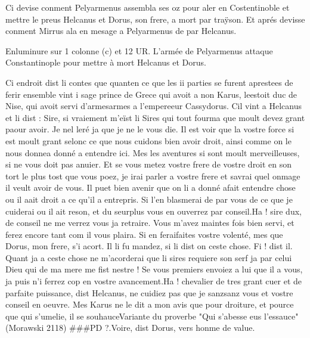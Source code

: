 \documentclass{article}
\begin{document}
\begin{pages}
         
            Ci devise 
               conment Pelyarmenus 
               assembla ses oz pour aler en Costentinoble 
               et mettre le preus Helcanus et 
               Dorus, son frere, 
               a mort par traÿson. Et aprés devisse conment Mirrus 
               ala en mesage a Pelyarmenus de par 
                  Helcanus.
            
               Enluminure sur 1 colonne (c) et 12 UR.
                  L’armée de Pelyarmenus attaque 
                  Constantinople pour mettre à mort 
                  Helcanus et Dorus. 
               
            
\pstart Ci endroit dist li contes que
   quanten ce que les ii parties 
   se furent 
   aprestees de ferir ensemble vint i sage prince de Grece qui avoit a non 
   Karus, leestoit 
      duc de Nise, qui 
   avoit servi d’armesarmes a l’empereeur 
   Cassydorus. Cil vint a Helcanus et li dist :
   Sire, si vraiement m’eïst li Sires qui tout fourma que moult devez grant paour avoir.
      Je nel leré ja 
      que je ne le vous die. Il est voir que la vostre force si est moult grant selonc ce que nous cuidons bien avoir droit, 
      ainsi comme on le nous 
      donnea donné a entendre 
      ici. Mes les aventures si sont moult merveilleuses, si ne vous 
      doit pas anuier. Et se vous metez vostre frere 
   de vostre droit en son tort le plus tost que vous poez, je irai parler a vostre frere 
      et savrai quel onmage il veult avoir de vous. Il puet bien avenir que on li a 
      donné afait entendre chose ou il 
      aait droit a ce qu’il a entrepris. 
   Si l’en blasmerai de par vous de ce que je cuiderai ou il ait reson, et du seurplus vous en ouverrez par conseil.Ha ! sire dux, de conseil ne me verrez vous ja retraire. Vous m’avez maintes fois bien servi, 
      et ferez encore tant com il vous plaira. Si en feraifaites vostre 
      volenté, mes que Dorus, mon frere, s’i acort. 
   Il li fu mandez, si li dist on ceste chose.
   Fi ! dist il. Quant ja a ceste chose ne 
      m’acorderai que li sires requiere son serf ja 
   par celui Dieu qui de ma mere me fist nestre ! Se vous premiers envoiez a lui que il a vous, ja puis n’i ferrez cop en vostre avancement.Ha ! chevalier de tres grant cuer et de parfaite puissance, dist Helcanus, 
      ne cuidiez pas que je sanzsanz vous et vostre conseil en oeuvre. 
      Mes Karus ne le dit a mon avis 
   que pour droiture, et pource que qui s’umelie, il se souhauceVariante
      du proverbe "Qui s'abesse eus l'essauce" (Morawski 2118) ###PD ?.Voire, dist Dorus, vers honme de value. 

\end{pages}
\end{document}
